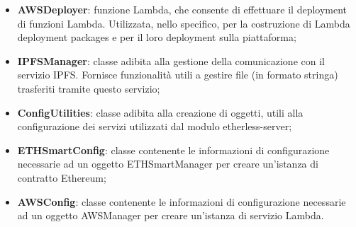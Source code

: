 \begin{itemize}
	\item \textbf{AWSDeployer}: funzione Lambda, che consente di effettuare il deployment di funzioni Lambda. Utilizzata, nello specifico, per la costruzione di Lambda deployment packages e per il loro deployment sulla piattaforma;
	\item \textbf{IPFSManager}: classe adibita alla gestione della comunicazione con il servizio IPFS. Fornisce funzionalità utili a gestire file (in formato stringa) trasferiti tramite questo servizio;
	\item \textbf{ConfigUtilities}: classe adibita alla creazione di oggetti, utili alla configurazione dei servizi utilizzati dal modulo etherless-server;
	\item \textbf{ETHSmartConfig}: classe contenente le informazioni di configurazione necessarie ad un oggetto ETHSmartManager per creare un'istanza di contratto Ethereum;
	\item \textbf{AWSConfig}: classe contenente le informazioni di configurazione necessarie ad un oggetto AWSManager per creare un'istanza di servizio Lambda.
\end{itemize}
